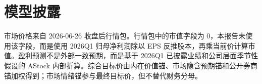 \section{模型披露}
市场价格来自 2026-06-26 收盘后行情包。行情包中的市值字段为 0，本报告未使用该字段，而是使用 2026Q1 归母净利润除以 EPS 反推股本，再乘当前价计算市值。盈利预测不是外部一致预期，而是基于 2026Q1 已披露业绩和公司层面季节性假设的 AStock 内部折算。综合目标价由内在价值锚、市场隐含预期锚和公开券商锚加权得到；市场情绪锚参与最终目标价，但不替代财务分母。
